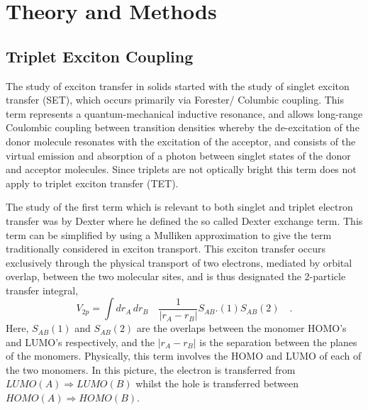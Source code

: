\documentclass[aps,physrev,reprint,superscriptaddress,nofootinbib,amsmath,amssymb,a4paper]{revtex4-2}
\begin{document}
\section{Theory and Methods}
\subsection{Triplet Exciton Coupling}

The study of exciton transfer in solids started with the study of singlet exciton transfer (SET), which occurs primarily via Forester/ 
Columbic coupling\cite{Frster1948,Frster1960, forster1967mechanisms, Hsu2009, Frster1960}. This term represents a quantum-mechanical
inductive resonance, and allows long-range Coulombic coupling between transition densities whereby the de-excitation of the donor molecule resonates with the excitation of the acceptor, and consists of the virtual emission and absorption of a photon between singlet states of the donor and acceptor molecules. Since triplets are not optically bright this term does not apply to triplet exciton transfer (TET).

The study of the first term which is relevant to both singlet and triplet electron transfer was by Dexter  \cite{Dexter1953} where he defined the so called Dexter exchange term. This term can be simplified by using a Mulliken approximation\cite{Ayed1986} to give the term traditionally considered in exciton transport.  This exciton transfer occurs exclusively through the physical transport of two electrons, mediated by orbital overlap, between the two molecular sites, and is thus designated the 2-particle transfer integral, 
\begin{equation}
    V_{2p} = \int dr_A \, dr_B \quad \frac{1}{|r_A-r_B|} S_{AB}.(1)S_{AB}(2) \quad.
\end{equation}
Here, $S_{AB}(1)$ and $S_{AB}(2)$ are the overlaps between the monomer HOMO's and LUMO's respectively, and the $|r_A-r_B|$ is the separation between the planes of the monomers. Physically, this term involves the HOMO and LUMO of each of the two monomers. In this picture, the electron is transferred from $LUMO(A) \Rightarrow LUMO(B)$ whilst the hole is transferred between $HOMO(A)\Rightarrow HOMO(B)$. 
\end{document}
